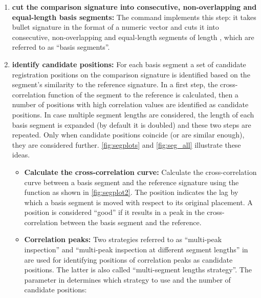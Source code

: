 \begin{enumerate}
\def\labelenumi{\arabic{enumi}.}
\item
  \textbf{cut the comparison signature into consecutive, non-overlapping
  and equal-length basis segments:} The command
   implements this step: it takes bullet
  signature  in the format of a numeric vector and cuts it into
  consecutive, non-overlapping and equal-length segments of length
  , which are referred to as ``basis segments''.
\item
  \textbf{identify candidate positions:} For each basis segment a set of
  candidate registration positions on the comparison signature is
  identified based on the segment's similarity to the reference
  signature. In a first step, the cross-correlation function of the
  segment to the reference is calculated, then a number of positions
  with high correlation values are identified as candidate positions. In
  case multiple segment lengths are considered, the length of each basis
  segment is expanded (by default it is doubled) and these two steps are
  repeated. Only when candidate positions coincide (or are similar
  enough), they are considered further. \autoref{fig:segplots} and
  \autoref{fig:seg_all} illustrate these ideas.

  \begin{itemize}
  \item
    \textbf{Calculate the cross-correlation curve:} Calculate the
    cross-correlation curve between a basis segment  and the
    reference signature  using the function
     as shown in \autoref{fig:segplot2}. The
    position indicates the lag by which a basis segment is moved with
    respect to its original placement. A position is considered ``good''
    if it results in a peak in the cross-correlation between the basis
    segment and the reference.
  \item
    \textbf{Correlation peaks:} Two strategies referred to as
    ``multi-peak inspection'' and ``multi-peak inspection at different
    segment lengths'' in \citet{cmps} are used for identifying positions
    of correlation peaks as candidate positions. The latter is also
    called ``multi-segment lengths strategy''. The parameter
     in  determines
    which strategy to use and the number of candidate positions:


\end{itemize}
\end{enumerate}
